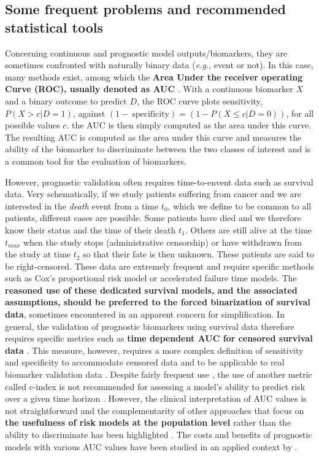 \documentclass[a4paper,12pt,twoside,onecolumn,openright,final,oldfontcommands]{memoir}
\begin{document}
\subsection{Some frequent problems and recommended statistical
tools}\label{some-frequent-problems-and-recommended-statistical-tools}

Concerning continuous and prognostic model outputs/biomarkers, they are
sometimes confronted with naturally binary data (\emph{e.g.}, event or
not). In this case, many methods exist, among which the \textbf{Area
Under the receiver operating Curve (ROC), usually denoted as AUC}
\citep{soreide2009receiver}. With a continuous biomarker \(X\) and a
binary outcome to predict \(D\), the ROC curve plots sensitivity,
\(P(X > c | D = 1)\), against
\((1 -~\text{specificity})= (1-P(X\leq c|D= 0))\), for all possible
values \(c\). the AUC is then simply computed as the area under this
curve. The resulting AUC is computed as the area under this curve and
measures the ability of the biomarker to discriminate between the two
classes of interest and is a common tool for the evaluation of
biomarkers.

However, prognostic validation often requires time-to-envent data such
as survival data. Very schematically, if we study patients suffering
from cancer and we are interested in the \emph{death} event from a time
\(t_0\), which we define to be common to all patients, different cases
are possible. Some patients have died and we therefore know their status
and the time of their death \(t_1\). Others are still alive at the time
\(t_{max}\) when the study stops (administrative censorship) or have
withdrawn from the study at time \(t_2\) so that their fate is then
unknown. These patients are said to be right-censored. These data are
extremely frequent and require specific methods such as Cox's
proportional risk model \citep{cox1972regression} or accelerated failure
time models. The \textbf{reasoned use of these dedicated survival
models, and the associated assumptions, should be preferred to the
forced binarization of survival data}, sometimes encountered in an
apparent concern for simplification. In general, the validation of
prognostic biomarkers using survival data therefore requires specific
metrics such as \textbf{time dependent AUC for censored survival data}
\citep{heagerty2000time}. This measure, however, requires a more complex
definition of sensitivity and specificity to accommodate censored data
\citep{heagerty2005survival} and to be applicable to real biomarker
validation data \citep{buyse2006validation}. Despite fairly frequent use
\citep{ching2018cox}, the use of another metric called c-index is not
recommended for assessing a model's ability to predict risk over a given
time horizon \citep{blanche2019c}. However, the clinical interpretation
of AUC values is not straightforward and the complementarity of other
approaches that focus on \textbf{the usefulness of risk models at the
population level} rather than the ability to discriminate has been
highlighted \citep{pepe2008integrating}. The costs and benefits of
prognostic models with various AUC values have been studied in an
applied context by \citet{gail2018breast}.
\end{document}
